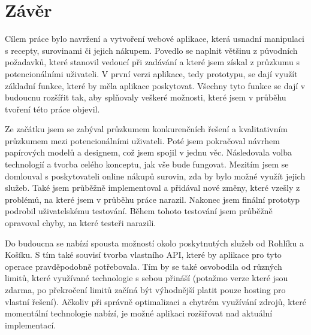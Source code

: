 
\chapter{Závěr}


Cílem práce bylo navržení a vytvoření webové aplikace, která usnadní manipulaci s recepty, surovinami či jejich nákupem.
Povedlo se naplnit většinu z původních požadavků, které stanovil vedoucí při zadávání a které jsem získal z průzkumu s potencionálními
uživateli. V první verzi aplikace, tedy prototypu, se dají využít základní funkce, které by měla aplikace poskytovat. Všechny tyto
funkce se dají v budoucnu rozšířit tak, aby splňovaly veškeré možnosti, které jsem v průběhu tvoření této práce objevil.

Ze začátku jsem se zabýval průzkumem konkurenčních řešení a kvalitativním průzkumem mezi potencionálními uživateli. Poté
jsem pokračoval návrhem papírových modelů a designem, což jsem spojil v jednu věc. Následovala volba technologií a tvorba
celého konceptu, jak vše bude fungovat. Mezitím jsem se domlouval s poskytovateli online nákupů surovin, zda by bylo možné
využít jejich služeb. Také jsem průběžně implementoval a přidával nové změny, které vzešly z problémů, na které jsem v průběhu
práce narazil. Nakonec jsem finální prototyp podrobil uživatelskému testování. Během tohoto testování jsem průběžně opravoval
chyby, na které testeři narazili.

Do budoucna se nabízí spousta možností okolo poskytnutých služeb od Rohlíku a Košíku. S tím také souvisí tvorba vlastního
API, které by aplikace pro tyto operace pravděpodobně potřebovala. Tím by se také osvobodila od různých limitů, které využívané
technologie s sebou přináší (potažmo verze které jsou zdarma, po překročení limitů začíná být výhodnější platit pouze hosting
pro vlastní řešení). Ačkoliv při správně optimalizaci a chytrém využívání zdrojů, které momentální technologie nabízí, je možné
aplikaci rozšiřovat nad aktuální implementací.
